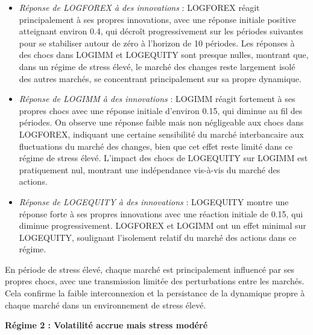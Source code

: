\begin{itemize}
    \item \textit{Réponse de LOGFOREX à des innovations} : LOGFOREX réagit principalement à ses propres innovations, avec une réponse initiale positive atteignant environ 0.4, qui décroît progressivement sur les périodes suivantes pour se stabiliser autour de zéro à l'horizon de 10 périodes. Les réponses à des chocs dans LOGIMM et LOGEQUITY sont presque nulles, montrant que, dans un régime de stress élevé, le marché des changes reste largement isolé des autres marchés, se concentrant principalement sur sa propre dynamique.
    
    \item \textit{Réponse de LOGIMM à des innovations} : LOGIMM réagit fortement à ses propres chocs avec une réponse initiale d'environ 0.15, qui diminue au fil des périodes. On observe une réponse faible mais non négligeable aux chocs dans LOGFOREX, indiquant une certaine sensibilité du marché interbancaire aux fluctuations du marché des changes, bien que cet effet reste limité dans ce régime de stress élevé. L'impact des chocs de LOGEQUITY sur LOGIMM est pratiquement nul, montrant une indépendance vis-à-vis du marché des actions.
    
    \item \textit{Réponse de LOGEQUITY à des innovations} : LOGEQUITY montre une réponse forte à ses propres innovations avec une réaction initiale de 0.15, qui diminue progressivement. LOGFOREX et LOGIMM ont un effet minimal sur LOGEQUITY, soulignant l’isolement relatif du marché des actions dans ce régime.
\end{itemize}

En période de stress élevé, chaque marché est principalement influencé par ses propres chocs, avec une transmission limitée des perturbations entre les marchés. Cela confirme la faible interconnexion et la persistance de la dynamique propre à chaque marché dans un environnement de stress élevé.

\vspace{0.5cm}

\textbf{Régime 2 : Volatilité accrue mais stress modéré}

